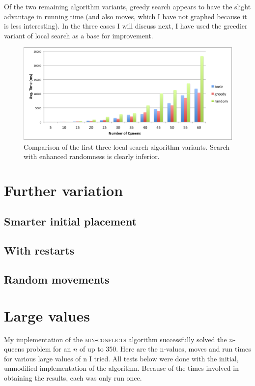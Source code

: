 \documentclass{article}
\begin{document}
\begin{doublespace}
Of the two remaining algorithm variants, greedy search appears to have the slight advantage in running time (and also moves, which I have not graphed because it is less interesting). In the three cases I will discuss next, I have used the greedier variant of local search as a base for improvement.

\begin{figure}[ht!]
\centering
\includegraphics[width=6.5in]{./compare1-3.png}
\caption{Comparison of the first three local search algorithm variants. Search with enhanced randomness is clearly inferior.}
\end{figure}

\section{Further variation}
\subsection{Smarter initial placement}


\subsection{With restarts}

\subsection{Random movements}

\section{Large values}
My implementation of the \textsc{min-conflicts} algorithm successfully solved the $n$-queens problem for an $n$ of up to 350. Here are the n-values, moves and run times for various large values of n I tried. All tests below were done with the initial, unmodified implementation of the algorithm. Because of the times involved in obtaining the results, each was only run once.


\end{doublespace}
\end{document}
